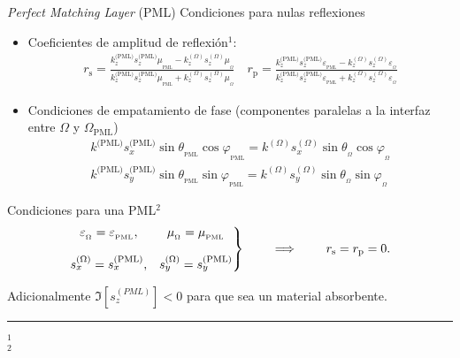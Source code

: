 \begin{frame}{\textit{Perfect Matching Layer} (PML)}
{Condiciones para nulas reflexiones}
\small
\begin{itemize}
     \item Coeficientes de amplitud de reflexión$^1$:
        \begin{align*}
       r_\text{s} = \frac{k^\text{(PML)}_z s^\text{(PML)}_z\mu_{{}_\text{PML}} - k^{(\Omega)}_z s^{(\Omega)}_z\mu_{{}_\Omega}}
                        {k^\text{(PML)}_z s^\text{(PML)}_z\mu_{{}_\text{PML}} + k^{(\Omega)}_z s^{(\Omega)}_z\mu_{{}_\Omega}}
           \quad
       r_\text{p} = \frac{k^\text{(PML)}_z s^\text{(PML)}_z\varepsilon_{{}_\text{PML}} - k^{(\Omega)}_z s^{(\Omega)}_z\varepsilon_{{}_\Omega}}
                        {k^\text{(PML)}_z s^\text{(PML)}_z\varepsilon_{{}_\text{PML}} + k^{(\Omega)}_z s^{(\Omega)}_z\varepsilon_{{}_\Omega}}
        \end{align*}
    \item Condiciones de empatamiento de fase (componentes paralelas a la interfaz entre $\Omega$ y $\Omega_\text{PML}$)
        \begin{align*}
             k^\text{(PML)} s^\text{(PML)}_x \sin\theta_{{}_\text{PML}}\cos\varphi_{{}_\text{PML}} =
                        k^{(\Omega)} s^{(\Omega)}_x \sin\theta_{{}_\Omega}\cos\varphi_{{}_\Omega}\\
        k^\text{(PML)} s^\text{(PML)}_y \sin\theta_{{}_\text{PML}}\sin\varphi_{{}_\text{PML}} =
                     k^{(\Omega)} s^{(\Omega)}_y \sin\theta_{{}_\Omega}\sin\varphi_{{}_\Omega}
        \end{align*}
\end{itemize}

    \begin{alertblock}{Condiciones para una PML$^2$}
    \begin{align*}
            \left. \mqty{\varepsilon_{{}_\Omega}=\varepsilon_{{}_\text{PML}} ,
                                                &\mu_{{}_\Omega}=\mu_{{}_\text{PML}}
                                                \\
                                                \\
                                            s^{(\Omega)}_x  = s^\text{(PML)}_x,
                                            &  s^{(\Omega)}_y  = s^\text{(PML)}_y} \right\}
                    \qquad\implies \qquad
           r_\text{s} = r_\text{p} = 0 .
    \end{align*}

    Adicionalmente $\Im[s_z^{(PML)}]<0$ para que sea un material absorbente.
    \end{alertblock}
%
	\noindent\rule{.25\textwidth}{0.4pt}
 \begin{spacing}{0}\fontsize{4}{12} \selectfont
	$^1$ \\
	$^2$ 
	\end{spacing}
\end{frame}



